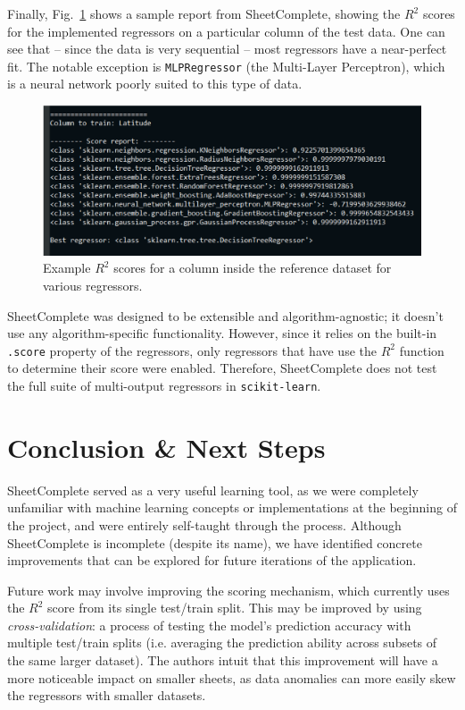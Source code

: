 \documentclass[conference]{IEEEtran}
\begin{document}
Finally, Fig.~\ref{accuracy} shows a sample report from SheetComplete, showing the $R^2$ scores for the implemented regressors on a particular column of the test data. One can see that -- since the data is very sequential -- most regressors have a near-perfect fit. The notable exception is \texttt{MLPRegressor} (the Multi-Layer Perceptron), which is a neural network poorly suited to this type of data. 

\begin{figure}[htbp]
\centerline{\includegraphics[width=\columnwidth]{img/output-accuracy.png}}
\caption{Example $R^2$ scores for a column inside the reference dataset for various regressors.}
\label{accuracy}
\end{figure}

SheetComplete was designed to be extensible and algorithm-agnostic; it doesn't use any algorithm-specific functionality. However, since it relies on the built-in \texttt{.score} property of the regressors, only regressors that have use the $R^2$ function to determine their score were enabled. Therefore, SheetComplete does not test the full suite of multi-output regressors in \texttt{scikit-learn}. 

\section{Conclusion \& Next Steps}
SheetComplete served as a very useful learning tool, as we were completely unfamiliar with machine learning concepts or implementations at the beginning of the project, and were entirely self-taught through the process. Although SheetComplete is incomplete (despite its name), we have identified concrete improvements that can be explored for future iterations of the application.

Future work may involve improving the scoring mechanism, which currently uses the $R^2$ score from its single test/train split. This may be improved by using \textit{cross-validation}: a process of testing the model's prediction accuracy with multiple test/train splits (i.e. averaging the prediction ability across subsets of the same larger dataset). The authors intuit that this improvement will have a more noticeable impact on smaller sheets, as data anomalies can more easily skew the regressors with smaller datasets.
\end{document}
